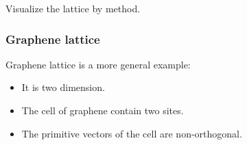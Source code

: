 \documentclass[letterpaper,10pt,english]{sphinxmanual}
\begin{document}
Visualize the lattice by  method.

\begin{figure}[htbp]
\centering

\noindent{}
\end{figure}


\subsubsection{Graphene lattice}
\label{\detokenize{user_model_system:graphene-lattice}}
Graphene lattice is a more general example:
\begin{itemize}
\item {} 
It is two dimension.

\item {} 
The cell of graphene contain two sites.

\item {} 
The primitive vectors of the cell are non-orthogonal.

\end{itemize}
\end{document}
